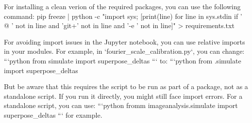 For installing a clean verion of the required packages, you can use the following command:
pip freeze | python -c "import sys; [print(line) for line in sys.stdin if ' @ ' not in line and 'git+' not in line and '-e ' not in line]" > requirements.txt


For avoiding import issues in the Jupyter notebook, you can use relative imports in your modules. For example, in `fourier_scale_calibration.py`, you can change:
```python
from simulate import superpose_deltas
```
to:
```python
from .simulate import superpose_deltas

But be aware that this requires the script to be run as part of a package, not as a standalone script. If you run it directly, you might still face import errors.
For a standalone script, you can use:
```python
fromm imageanalysis.simulate import superpose_deltas 
```
for example.